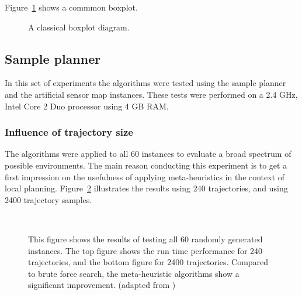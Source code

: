 Figure~\ref{fig:fig_boxplot} shows a commmon boxplot. 
\begin{figure}[thpb]
     \footnotesize
      \centering
      \myfloatalign
      \setlength\fboxsep{0pt}
      \setlength\fboxrule{0.5pt}
       \caption{A classical boxplot diagram.}
      \label{fig:fig_boxplot}
   \end{figure}

\subsection{Sample planner}
In this set of experiments the algorithms were tested using the sample planner and the artificial sensor map instances. 
These tests were performed on a 2.4 GHz, Intel Core 2 Duo processor using 4 GB RAM. 

\subsubsection{Influence of trajectory size}
The algorithms were applied to all 60 instances to evaluate a broad spectrum of possible environments. 
The main reason conducting this experiment is to get a first impression on the usefulness of applying meta-heuristics in the context of local planning. 
Figure~\ref{fig:fig_allworlds} illustrates the results using 240 trajectories, and using 2400 trajectory samples.

\begin{figure}[thpb]
   \myfloatalign
    \tiny
    \centering
    \\
    \caption[Experiment: All instances]{This figure shows the results of testing all 60 randomly generated instances. The top figure shows the run time performance for 240 trajectories, and the bottom figure for 2400 trajectories. Compared to brute force search, the meta-heuristic algorithms show a significant improvement. (adapted from \cite{myself})}
      \label{fig:fig_allworlds}
   \end{figure}

